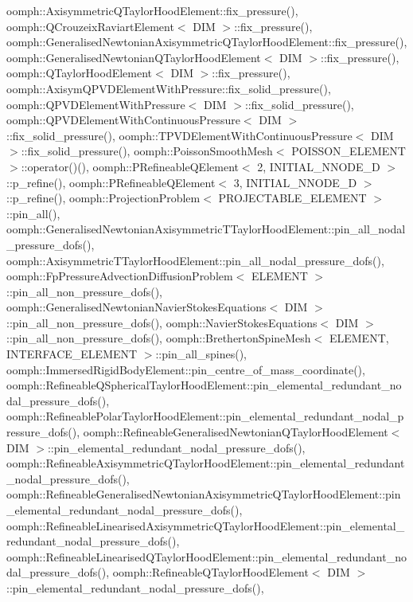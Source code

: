 oomph\+::\+Axisymmetric\+Q\+Taylor\+Hood\+Element\+::fix\+\_\+pressure(), oomph\+::\+Q\+Crouzeix\+Raviart\+Element$<$ D\+I\+M $>$\+::fix\+\_\+pressure(), oomph\+::\+Generalised\+Newtonian\+Axisymmetric\+Q\+Taylor\+Hood\+Element\+::fix\+\_\+pressure(), oomph\+::\+Generalised\+Newtonian\+Q\+Taylor\+Hood\+Element$<$ D\+I\+M $>$\+::fix\+\_\+pressure(), oomph\+::\+Q\+Taylor\+Hood\+Element$<$ D\+I\+M $>$\+::fix\+\_\+pressure(), oomph\+::\+Axisym\+Q\+P\+V\+D\+Element\+With\+Pressure\+::fix\+\_\+solid\+\_\+pressure(), oomph\+::\+Q\+P\+V\+D\+Element\+With\+Pressure$<$ D\+I\+M $>$\+::fix\+\_\+solid\+\_\+pressure(), oomph\+::\+Q\+P\+V\+D\+Element\+With\+Continuous\+Pressure$<$ D\+I\+M $>$\+::fix\+\_\+solid\+\_\+pressure(), oomph\+::\+T\+P\+V\+D\+Element\+With\+Continuous\+Pressure$<$ D\+I\+M $>$\+::fix\+\_\+solid\+\_\+pressure(), oomph\+::\+Poisson\+Smooth\+Mesh$<$ P\+O\+I\+S\+S\+O\+N\+\_\+\+E\+L\+E\+M\+E\+N\+T $>$\+::operator()(), oomph\+::\+P\+Refineable\+Q\+Element$<$ 2, I\+N\+I\+T\+I\+A\+L\+\_\+\+N\+N\+O\+D\+E\+\_\+D $>$\+::p\+\_\+refine(), oomph\+::\+P\+Refineable\+Q\+Element$<$ 3, I\+N\+I\+T\+I\+A\+L\+\_\+\+N\+N\+O\+D\+E\+\_\+D $>$\+::p\+\_\+refine(), oomph\+::\+Projection\+Problem$<$ P\+R\+O\+J\+E\+C\+T\+A\+B\+L\+E\+\_\+\+E\+L\+E\+M\+E\+N\+T $>$\+::pin\+\_\+all(), oomph\+::\+Generalised\+Newtonian\+Axisymmetric\+T\+Taylor\+Hood\+Element\+::pin\+\_\+all\+\_\+nodal\+\_\+pressure\+\_\+dofs(), oomph\+::\+Axisymmetric\+T\+Taylor\+Hood\+Element\+::pin\+\_\+all\+\_\+nodal\+\_\+pressure\+\_\+dofs(), oomph\+::\+Fp\+Pressure\+Advection\+Diffusion\+Problem$<$ E\+L\+E\+M\+E\+N\+T $>$\+::pin\+\_\+all\+\_\+non\+\_\+pressure\+\_\+dofs(), oomph\+::\+Generalised\+Newtonian\+Navier\+Stokes\+Equations$<$ D\+I\+M $>$\+::pin\+\_\+all\+\_\+non\+\_\+pressure\+\_\+dofs(), oomph\+::\+Navier\+Stokes\+Equations$<$ D\+I\+M $>$\+::pin\+\_\+all\+\_\+non\+\_\+pressure\+\_\+dofs(), oomph\+::\+Bretherton\+Spine\+Mesh$<$ E\+L\+E\+M\+E\+N\+T, I\+N\+T\+E\+R\+F\+A\+C\+E\+\_\+\+E\+L\+E\+M\+E\+N\+T $>$\+::pin\+\_\+all\+\_\+spines(), oomph\+::\+Immersed\+Rigid\+Body\+Element\+::pin\+\_\+centre\+\_\+of\+\_\+mass\+\_\+coordinate(), oomph\+::\+Refineable\+Q\+Spherical\+Taylor\+Hood\+Element\+::pin\+\_\+elemental\+\_\+redundant\+\_\+nodal\+\_\+pressure\+\_\+dofs(), oomph\+::\+Refineable\+Polar\+Taylor\+Hood\+Element\+::pin\+\_\+elemental\+\_\+redundant\+\_\+nodal\+\_\+pressure\+\_\+dofs(), oomph\+::\+Refineable\+Generalised\+Newtonian\+Q\+Taylor\+Hood\+Element$<$ D\+I\+M $>$\+::pin\+\_\+elemental\+\_\+redundant\+\_\+nodal\+\_\+pressure\+\_\+dofs(), oomph\+::\+Refineable\+Axisymmetric\+Q\+Taylor\+Hood\+Element\+::pin\+\_\+elemental\+\_\+redundant\+\_\+nodal\+\_\+pressure\+\_\+dofs(), oomph\+::\+Refineable\+Generalised\+Newtonian\+Axisymmetric\+Q\+Taylor\+Hood\+Element\+::pin\+\_\+elemental\+\_\+redundant\+\_\+nodal\+\_\+pressure\+\_\+dofs(), oomph\+::\+Refineable\+Linearised\+Axisymmetric\+Q\+Taylor\+Hood\+Element\+::pin\+\_\+elemental\+\_\+redundant\+\_\+nodal\+\_\+pressure\+\_\+dofs(), oomph\+::\+Refineable\+Linearised\+Q\+Taylor\+Hood\+Element\+::pin\+\_\+elemental\+\_\+redundant\+\_\+nodal\+\_\+pressure\+\_\+dofs(), oomph\+::\+Refineable\+Q\+Taylor\+Hood\+Element$<$ D\+I\+M $>$\+::pin\+\_\+elemental\+\_\+redundant\+\_\+nodal\+\_\+pressure\+\_\+dofs(), 